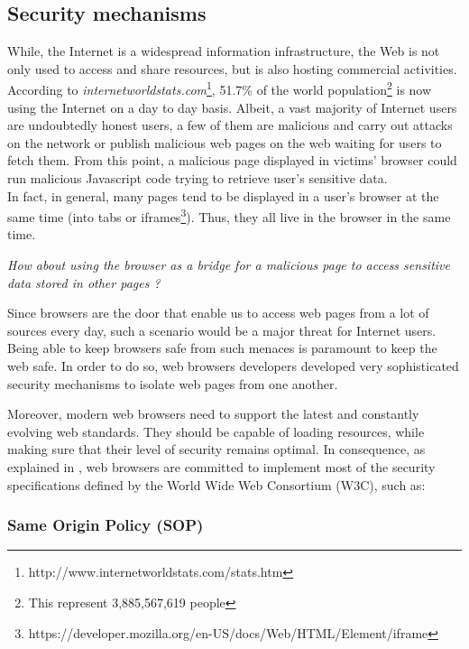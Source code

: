 \documentclass[journal]{IEEEtran}
\begin{document}
\subsection{Security mechanisms}
While, the Internet is a widespread information infrastructure, the Web is not only used to access and share resources, but is also hosting commercial activities. According to \emph{internetworldstats.com}\footnote{http://www.internetworldstats.com/stats.htm}, 51.7\% of the world population\footnote{This represent 3,885,567,619 people} is now using the Internet on a day to day basis. Albeit, a vast majority of Internet users are undoubtedly honest users, a few of them are malicious and carry out attacks on the network or publish malicious web pages on the web waiting for users to fetch them. From this point, a malicious page displayed in victims' browser could run malicious Javascript code trying to retrieve user's sensitive data. \\
In fact, in general, many pages tend to be displayed in a user's browser at the same time (into tabs or iframes\footnote{https://developer.mozilla.org/en-US/docs/Web/HTML/Element/iframe}). Thus, they all live in the browser in the same time. 

\medskip

\emph{How about using the browser as a bridge for a malicious page to access sensitive data stored in other pages ?}

\medskip

Since browsers are the door that enable us to access web pages from a lot of sources every day, such a scenario would be a major threat for Internet users. Being able to keep browsers safe from such menaces is paramount to keep the web safe. In order to do so, web browsers developers developed very sophisticated security mechanisms to isolate web pages from one another.

Moreover, modern web browsers need to support the latest and constantly evolving web standards. They should be capable of loading resources, while making sure that their level of security remains optimal. In consequence, as explained in \cite{browserSecurity}, web browsers are committed to implement most of the security specifications \cite{SOP} \cite{CORS} \cite{CSP} \cite{SRI} \cite{MixedContent} defined by the World Wide Web Consortium (W3C), such as:

\medskip

\subsubsection{Same Origin Policy (SOP)}
\end{document}
